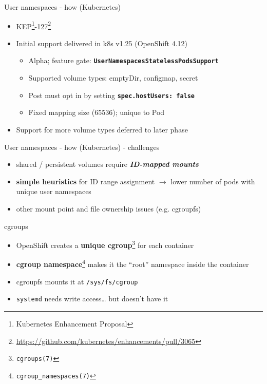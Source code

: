 \documentclass[ignorenonframetext,aspectratio=169,12pt]{beamer}
\begin{document}
\begin{frame}{User namespaces - how (Kubernetes)}
\protect\hypertarget{userns-how-kubernetes}{}
\begin{itemize}
\item KEP\footnote{Kubernetes Enhancement Proposal}-127\footnote{\url{https://github.com/kubernetes/enhancements/pull/3065}}
\item Initial support delivered in k8s v1.25 (OpenShift 4.12)
    \begin{itemize}
        \item Alpha; feature gate: \textbf{\texttt{UserNamespacesStatelessPodsSupport}}
        \item Supported volume types: emptyDir, configmap, secret
        \item Post must opt in by setting \textbf{\texttt{spec.hostUsers: false}}
        \item Fixed mapping size (65536); unique to Pod
    \end{itemize}
\item Support for more volume types deferred to later phase
\end{itemize}
\end{frame}

\begin{frame}{User namespaces - how (Kubernetes) - challenges}
\protect\hypertarget{userns-how-kubernetes-3}{}
\begin{itemize}
\item shared / persistent volumes require \textbf{\em ID-mapped mounts}
\item {\bf simple heuristics} for ID range assignment $\to$ lower number
  of pods with unique user namespaces
\item other mount point and file ownership issues (e.g. cgroupfs)
\end{itemize}
\end{frame}


\begin{frame}{cgroups}
\protect\hypertarget{openshift-cgroup}{}
\begin{itemize}

\item OpenShift creates a {\bf unique cgroup}\footnote{\tt cgroups(7)} for each container

\item {\bf cgroup namespace}\footnote{\tt cgroup\_namespaces(7)} makes it the ``root''
      namespace inside the container

\item cgroupfs mounts it at {\tt /sys/fs/cgroup}

\item {\tt systemd} needs write access\ldots{} but doesn't have it

\end{itemize}
\end{frame}
\end{document}
